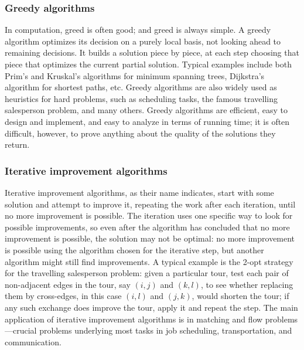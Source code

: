 \documentclass{article}
\begin{document}
\subsubsection{Greedy algorithms}
In computation, greed is often good; and greed is always simple.  A greedy
algorithm optimizes its decision on a purely local basis, not looking ahead
to remaining decisions.  It builds a solution piece by piece, at each step
choosing that piece that optimizes the current partial solution.  Typical
examples include both Prim's and Kruskal's algorithms for minimum spanning
trees, Dijkstra's algorithm for shortest paths, etc.  Greedy algorithms are
also widely used as heuristics for hard problems, such as scheduling tasks,
the famous travelling salesperson problem, and many others.  Greedy algorithms
are efficient, easy to design and implement, and easy to analyze in terms of
running time; it is often difficult, however, to prove anything about the
quality of the solutions they return.

\subsubsection{Iterative improvement algorithms}
Iterative improvement algorithms, as their name indicates, start with
some solution and attempt to improve it, repeating the work after each
iteration, until no more improvement is possible.
The iteration uses one specific way to look for possible improvements, so
even after the algorithm has concluded that no more improvement is possible,
the solution may not be optimal: no more improvement is possible using
the algorithm chosen for the iterative step, but another algorithm might
still find improvements.   A typical example is the 2-opt strategy for
the travelling salesperson problem: given a particular tour, test each pair of
non-adjacent edges in the tour, say $(i,j)$ and $(k,l)$, to see whether
replacing them by cross-edges, in this case $(i,l)$ and $(j,k)$, would
shorten the tour; if any such exchange does improve the tour, apply it
and repeat the step.  The main application of iterative improvement
algorithms is in matching and flow problems---crucial problems underlying
most tasks in job scheduling, transportation, and communication.
\end{document}
